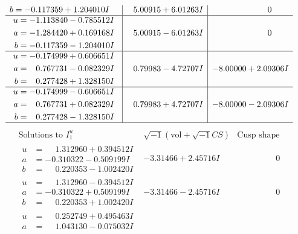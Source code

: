 \documentclass[1p]{elsarticle_modified}
\theoremstyle{definition}
\newcommand{\I}{\sqrt{-1}}
\begin{document}
$$\begin{array}{c|c|c}
\begin{aligned}
b &= -0.117359 + 1.204010 I\end{aligned}
 & \phantom{-}5.00915 + 6.01263 I & \phantom{-0.000000 } 0 \\ \hline\begin{aligned}
u &= -1.113840 - 0.785512 I \\
a &= -1.284420 + 0.169168 I \\
b &= -0.117359 - 1.204010 I\end{aligned}
 & \phantom{-}5.00915 - 6.01263 I & \phantom{-0.000000 } 0 \\ \hline\begin{aligned}
u &= -0.174999 + 0.606651 I \\
a &= \phantom{-}0.767731 - 0.082329 I \\
b &= \phantom{-}0.277428 + 1.328150 I\end{aligned}
 & \phantom{-}0.79983 - 4.72707 I & -8.00000 + 2.09306 I \\ \hline\begin{aligned}
u &= -0.174999 - 0.606651 I \\
a &= \phantom{-}0.767731 + 0.082329 I \\
b &= \phantom{-}0.277428 - 1.328150 I\end{aligned}
 & \phantom{-}0.79983 + 4.72707 I & -8.00000 - 2.09306 I\\
 \hline 
 \end{array}$$\newpage$$\begin{array}{c|c|c}  
\text{Solutions to }I^u_{1}& \I (\text{vol} + \sqrt{-1}CS) & \text{Cusp shape}\\
 \hline 
\begin{aligned}
u &= \phantom{-}1.312960 + 0.394512 I \\
a &= -0.310322 - 0.509199 I \\
b &= \phantom{-}0.220353 - 1.002420 I\end{aligned}
 & -3.31466 + 2.45716 I & \phantom{-0.000000 } 0 \\ \hline\begin{aligned}
u &= \phantom{-}1.312960 - 0.394512 I \\
a &= -0.310322 + 0.509199 I \\
b &= \phantom{-}0.220353 + 1.002420 I\end{aligned}
 & -3.31466 - 2.45716 I & \phantom{-0.000000 } 0 \\ \hline\begin{aligned}
u &= \phantom{-}0.252749 + 0.495463 I \\
a &= \phantom{-}1.043130 - 0.075032 I \\

\end{aligned}
\end{array}$$
\end{document}
